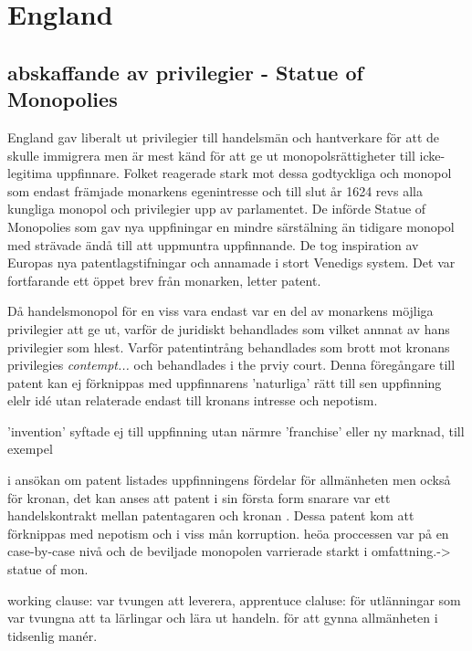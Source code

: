 \section{England} %
\label{sec:england}

\subsection{abskaffande av privilegier - Statue of Monopolies} %
\label{sub:abskaffande_av_privilegier_statue_of_monopolies}



England gav liberalt ut privilegier till handelsmän och hantverkare för att de skulle immigrera men är mest känd för att ge ut monopolsrättigheter till icke-legitima uppfinnare. 
Folket reagerade stark mot dessa godtyckliga och monopol som endast främjade monarkens egenintresse och till slut år 1624 revs alla kungliga monopol och privilegier upp av parlamentet. 
De införde Statue of Monopolies som gav nya uppfiningar en mindre särstälning än tidigare monopol med strävade ändå till att uppmuntra uppfinnande. 
De tog inspiration av Europas nya patentlagstifningar och annamade i stort Venedigs system. 
Det var fortfarande ett öppet brev från monarken, letter patent.

Då handelsmonopol för en viss vara endast var en del av monarkens möjliga privilegier att ge ut, varför de  juridiskt behandlades som vilket annnat av hans privilegier som hlest. Varför patentintrång behandlades som brott mot kronans privilegies \emph{contempt...} och behandlades i the prviy court. 
Denna föregångare till patent kan ej förknippas med uppfinnarens 'naturliga' rätt till sen uppfinning elelr idé utan relaterade endast till kronans intresse och nepotism. \cite{obracha}

'invention' syftade ej till uppfinning utan närmre 'franchise' eller ny marknad, till exempel 

i ansökan om patent listades uppfinningens fördelar för allmänheten men också för kronan, det kan anses att patent i sin första form snarare var ett handelskontrakt mellan patentagaren och kronan \cite{obracha}.
Dessa patent kom att förknippas med nepotism och i viss mån korruption. heöa proccessen var på en case-by-case nivå och de beviljade monopolen varrierade starkt i omfattning.-> statue of mon.

working clause: var tvungen att leverera, apprentuce claluse: för utlänningar som var tvungna att ta lärlingar och lära ut handeln. för att gynna allmänheten i tidsenlig manér.

